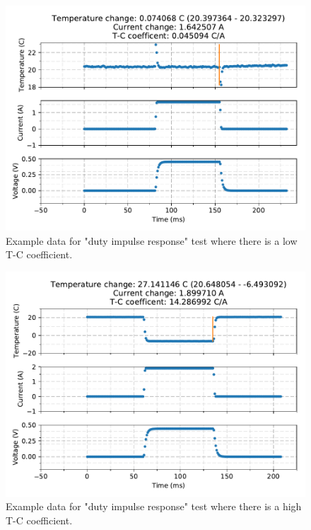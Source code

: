 \documentclass{article}
\begin{document}
\begin{figure}
    \center
    \includegraphics[scale=1]{figures/duty_impulse_response_data_0.pdf}
    \caption{Example data for "duty impulse response" test where there is a low T-C coefficient.}
    \label{fig:duty_impulse_response_low}
\end{figure}

\begin{figure}
    \center
    \includegraphics[scale=1]{figures/duty_impulse_response_data_1.pdf}
    \caption{Example data for "duty impulse response" test where there is a high T-C coefficient.}
    \label{fig:duty_impulse_response_high}
\end{figure}
\end{document}
